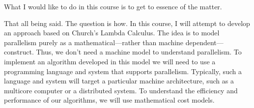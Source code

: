 %
What I would like to do in this course is to get to essence of the matter.  

That all being said.  The question is how.  
%
In this course, I will attempt to develop an approach based on Church's Lambda Calculus.
%
The idea is to model parallelism purely as a mathematical---rather than machine dependent---construct.
%
Thus, we don't need a machine model to understand parallelism.
%
To implement an algorithm developed in this model we will need to use a programming language and system that supports parallelism.
%
Typically, such a language and system will target a particular machine architecture, such as a multicore computer or a distributed system.
% 
To understand the efficiency and performance of our algorithms, we will use mathematical cost models.
  



 
